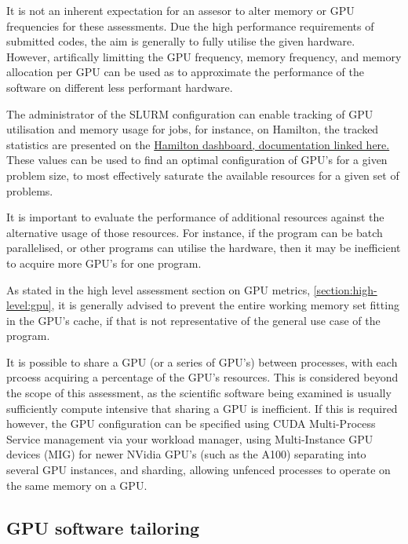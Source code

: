 It is not an inherent expectation for an assesor to alter memory or GPU frequencies for these assessments. Due the high performance requirements of submitted codes, the aim is generally to fully utilise the given hardware. However, artifically limitting the GPU frequency, memory frequency, and memory allocation per GPU can be used as to approximate the performance of the software on different less performant hardware.


The administrator of the SLURM configuration can enable tracking of GPU utilisation and memory usage for jobs, for instance, on Hamilton, the tracked statistics are presented on the \href{https://www.durham.ac.uk/research/institutes-and-centres/advanced-research-computing/hamilton-supercomputer/usage/portal/performance/}{Hamilton dashboard, documentation linked here.} These values can be used to find an optimal configuration of GPU's for a given problem size, to most effectively saturate the available resources for a given set of problems. 

\begin{summary}
	It is important to evaluate the performance of additional resources against the alternative usage of those resources. For instance, if the program can be batch parallelised, or other programs can utilise the hardware, then it may be inefficient to acquire more GPU's for one program.
\end{summary}

As stated in the high level assessment section on GPU metrics, \autoref{section:high-level:gpu}, it is generally advised to prevent the entire working memory set fitting in the GPU's cache, if that is not representative of the general use case of the program. 

It is possible to share a GPU (or a series of GPU's) between processes, with each prcoess acquiring a percentage of the GPU's resources. This is considered beyond the scope of this assessment, as the scientific software being examined is usually sufficiently compute intensive that sharing a GPU is inefficient. If this is required however, the GPU configuration can be specified using CUDA Multi-Process Service management via your workload manager, using Multi-Instance GPU devices (MIG) for newer NVidia GPU's (such as the A100) separating into several GPU instances, and sharding, allowing unfenced processes to operate on the same memory on a GPU.

\subsection{GPU software tailoring}
